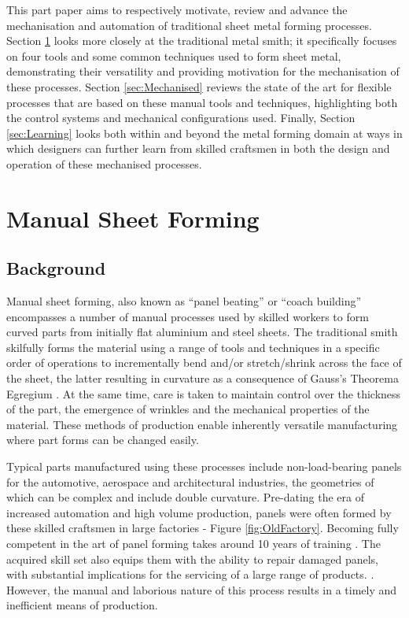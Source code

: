 This part paper aims to respectively motivate, review and advance the mechanisation and automation of traditional sheet metal forming processes. Section \ref{sec:Manual} looks more closely at the traditional metal smith; it specifically focuses on four tools and some common techniques used to form sheet metal, demonstrating their versatility and providing motivation for the mechanisation of these processes. Section \ref{sec:Mechanised} reviews the state of the art for flexible processes that are based on these manual tools and techniques, highlighting both the control systems and mechanical configurations used. Finally, Section \ref{sec:Learning} looks both within and beyond the metal forming domain at ways in which designers can further learn from skilled craftsmen in both the design and operation of these mechanised processes.


\newpage
\section{Manual Sheet Forming}\label{sec:Manual}
\subsection{Background}
Manual sheet forming, also known as ``panel beating'' or ``coach building'' encompasses a number of manual processes used by skilled workers to form curved parts from initially flat aluminium and steel sheets. The traditional smith skilfully forms the material using a range of tools and techniques in a specific order of operations to incrementally bend and/or stretch/shrink across the face of the sheet, the latter resulting in curvature as a consequence of Gauss's Theorema Egregium \citep{Pressley2001ElementaryGeometry}.  At the same time, care is taken to maintain control over the thickness of the part, the emergence of wrinkles and the mechanical properties of the material. These methods of production enable inherently versatile manufacturing where part forms can be changed easily.

Typical parts manufactured using these processes include non-load-bearing panels for the automotive, aerospace and architectural industries, the geometries of which can be complex and include double curvature. Pre-dating the era of increased automation and high volume production, panels were often formed by these skilled craftsmen in large factories - Figure \ref{fig:OldFactory}. Becoming fully competent in the art of panel forming takes around 10 years of training \citep{Goodwin2020BehindBeaters}. The acquired skill set also equips them with the ability to repair damaged panels, with substantial implications for the servicing of a large range of products. . However, the manual and laborious nature of this process results in a timely and inefficient means of production.

